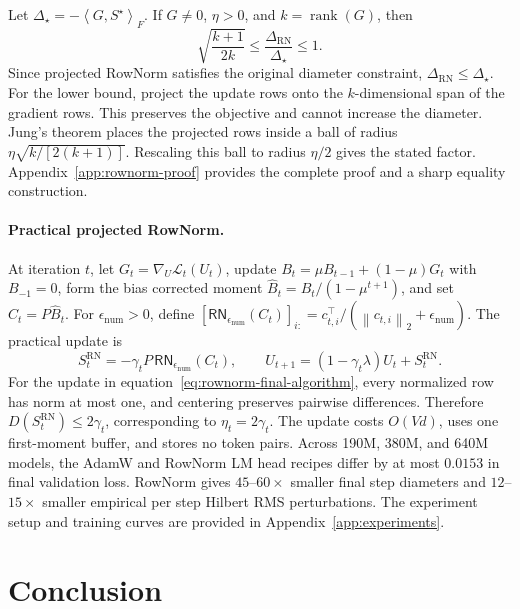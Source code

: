 \documentclass[anon]{opt2026} %
\newcommand{\norm}[1]{\left\lVert #1\right\rVert}
\newcommand{\inner}[2]{\left\langle #1,#2\right\rangle}
\DeclareMathOperator{\rank}{rank}
\begin{document}
Let $\Delta_\star=-\inner{G}{S^\star}_F$. If $G\neq0$, $\eta>0$, and
$k=\rank(G)$, then
\begin{equation}
\boxed{
\sqrt{\frac{k+1}{2k}}
\leq
\frac{\Delta_{\mathrm{RN}}}{\Delta_\star}
\leq1.
}
\label{eq:rownorm-guarantee}
\end{equation}
Since projected RowNorm satisfies the original diameter constraint, $\Delta_{\mathrm{RN}}\leq\Delta_\star$. For the lower bound, project the update rows onto the $k$-dimensional span of the gradient rows. This preserves the objective and cannot increase the diameter. Jung's theorem \citep{Jung1901,article} places the projected rows inside a ball of radius $\eta\sqrt{k/[2(k+1)]}$. Rescaling this ball to radius $\eta/2$ gives the stated factor. Appendix~\ref{app:rownorm-proof} provides the complete proof and a sharp equality construction.


\paragraph{Practical projected RowNorm.}
\label{sec:rownorm-algorithm}

At iteration $t$, let $G_t=\nabla_U\mathcal L_t(U_t)$, update $B_t=\mu B_{t-1}+(1-\mu)G_t$ with $B_{-1}=0$, form the bias corrected moment $\widehat B_t=B_t/(1-\mu^{t+1})$, and set $C_t=P\widehat B_t$. For $\epsilon_{\mathrm{num}}>0$, define $\left[\mathsf{RN}_{\epsilon_{\mathrm{num}}}(C_t)\right]_{i:} = c_{t,i}^\top/(\norm{c_{t,i}}_2+\epsilon_{\mathrm{num}})$. The practical update is
\begin{equation}
\boxed{
S_t^{\mathrm{RN}}
=-\gamma_tP\,\mathsf{RN}_{\epsilon_{\mathrm{num}}}(C_t),
\qquad
U_{t+1}=(1-\gamma_t\lambda)U_t+S_t^{\mathrm{RN}}.
}
\label{eq:rownorm-final-algorithm}
\end{equation}
For the update in equation~\ref{eq:rownorm-final-algorithm}, every normalized row has norm at most one, and centering preserves pairwise differences. Therefore $D(S_t^{\mathrm{RN}})\leq2\gamma_t$, corresponding to $\eta_t=2\gamma_t$. The update costs $O(Vd)$, uses one first-moment buffer, and stores no token pairs.
Across 190M, 380M, and 640M models, the AdamW and RowNorm LM head recipes differ by at most $0.0153$ in final validation loss. RowNorm gives $45$--$60\times$ smaller final step diameters and $12$--$15\times$ smaller empirical per step Hilbert RMS perturbations. The experiment setup and training curves are provided in Appendix~\ref{app:experiments}.


\section{Conclusion}
\end{document}
